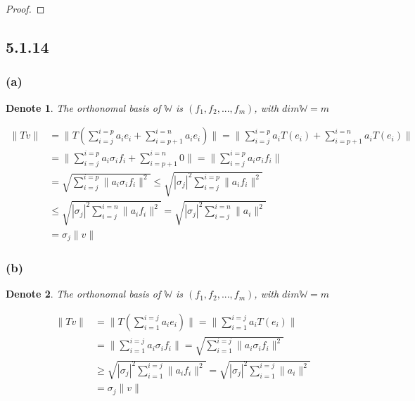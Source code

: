\documentclass{article}
\newtheorem*{denote}{Denote}
\newtheorem*{proof}{Proof}
\begin{document}
\begin{proof}
\end{proof}

\subsection*{5.1.14}
\subsubsection*{(a)}
\begin{denote}
    The orthonomal basis of $\mathbb{W}$ is $(f_1, f_2, ..., f_m)$, with $dim \mathbb{W} = m$
\end{denote}
\begin{equation*}
    \begin{split}
        \|Tv\| & = \|T(\sum_{i = j}^{i=p} a_ie_i + \sum_{i = p+1}^{i=n} a_ie_i)\| = \| \sum_{i = j}^{i=p} a_iT(e_i) + \sum_{i = p+1}^{i=n} a_iT(e_i)\| \\
            & = \| \sum_{i = j}^{i=p} a_i\sigma_if_i + \sum_{i = p+1}^{i=n} 0 \| = \| \sum_{i = j}^{i=p} a_i\sigma_if_i\| \\
            & = \sqrt{\sum_{i = j}^{i=p} \|a_i\sigma_if_i\|^2} \le \sqrt{|\sigma_j|^2\sum_{i = j}^{i=p} \|a_if_i\|^2} \\
            & \le \sqrt{|\sigma_j|^2\sum_{i = j}^{i=n} \|a_if_i\|^2} = \sqrt{|\sigma_j|^2\sum_{i = j}^{i=n} \|a_i\|^2} \\ & = \sigma_j\|v\|
    \end{split} 
\end{equation*}

\subsubsection*{(b)}
\begin{denote}
    The orthonomal basis of $\mathbb{W}$ is $(f_1, f_2, ..., f_m)$, with $dim \mathbb{W} = m$
\end{denote}
\begin{equation*}
    \begin{split}
        \|Tv\| &= \|T(\sum_{i = 1}^{i=j} a_ie_i)\|  =  \|\sum_{i = 1}^{i=j} a_iT(e_i)\|\\
        & = \|\sum_{i = 1}^{i=j} a_i \sigma_i f_i\| = \sqrt{\sum_{i = 1}^{i=j}\| a_i \sigma_i f_i\|^2} \\
        & \ge  \sqrt{|\sigma_j|^2\sum_{i = 1}^{i=j}\| a_i  f_i\|^2} = \sqrt{|\sigma_j|^2\sum_{i = 1}^{i=j}\| a_i \|^2} \\
        & = \sigma_j \| v\|
    \end{split} 
\end{equation*}
\end{document}
